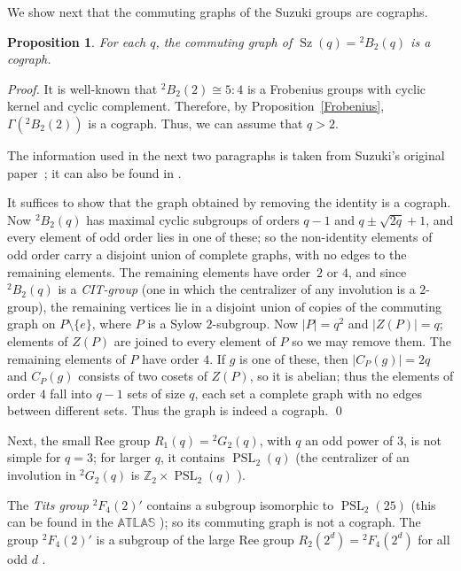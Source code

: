 \documentclass{elsarticle}
\newtheorem{prop}[theorem]{Proposition}
\newcommand{\PSL}{\mathop{\mathrm{PSL}}\nolimits}
\newcommand{\Sz}{\mathop{\mathrm{Sz}}\nolimits}
\begin{document}
We show next that the commuting graphs of the Suzuki groups are cographs.

\begin{prop}
For each $q$, the commuting graph of $\Sz(q)={}^2B_2(q)$ is a cograph.
\end{prop}

\begin{proof}
It is well-known that ${}^2B_2(2)\cong 5:4$ is a Frobenius groups with cyclic kernel and cyclic complement. Therefore, by Proposition~\ref{Frobenius}, $\Gamma({}^2B_2(2))$ is a cograph. Thus, we can assume that $q>2$.

The information used in the next two paragraphs is taken from Suzuki's original
paper~\cite{suzuki2}; it can also be found in \cite[Section 4.2]{Wilson-book}.

It suffices to show that the graph obtained by removing the identity is a
cograph. Now ${}^2B_2(q)$ has maximal cyclic subgroups of orders $q-1$ and
$q\pm\sqrt{2q}+1$, and every element of odd order lies in one of these; so
the non-identity elements of odd order carry a disjoint union of complete
graphs, with no edges to the remaining elements.
The remaining elements have order~$2$ or $4$, and since ${}^2B_2(q)$ is a
\emph{CIT-group} (one in which the centralizer of any involution is a
$2$-group), the remaining vertices lie in a disjoint union of copies of the
commuting graph on $P\setminus\{e\}$, where $P$ is a Sylow $2$-subgroup. Now
$|P|=q^2$ and $|Z(P)|=q$; elements of $Z(P)$ are joined to every element of $P$
so we may remove them. The remaining elements of $P$ have order $4$. If $g$
is one of these, then $|C_P(g)|=2q$ and $C_P(g)$ consists of two cosets of
$Z(P)$, so it is abelian; thus the elements of order $4$ fall into $q-1$
sets of size $q$, each set a complete graph with no edges between different
sets. Thus the graph is indeed a cograph.
\qed
\end{proof}

Next, the small Ree group $R_1(q)={}^2G_2(q)$, with $q$ an odd power of $3$, is not
simple for $q=3$; for larger $q$, it contains $\PSL_2(q)$ (the centralizer
of an involution in ${}^2G_2(q)$ is $\mathbb{Z}_2\times\PSL_2(q)$ \cite{Kleidman2}).

The \emph{Tits group} ${}^2F_4(2)'$ contains a subgroup isomorphic to
$\PSL_2(25)$ (this can be found in the $\mathbb{ATLAS}$ \cite{CC85}); so its
commuting graph is not a cograph. The group ${}^2F_4(2)'$ is a subgroup of the
large Ree group $R_2(2^d)={}^2F_4(2^d)$ for all odd $d$ \cite{Malle}.
\end{document}
